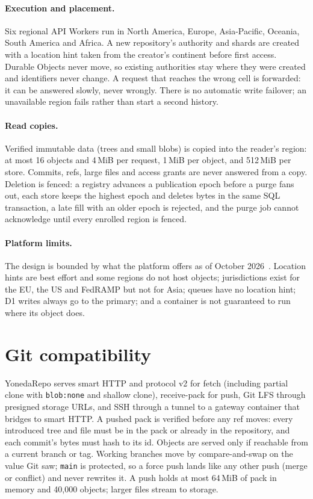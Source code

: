 \documentclass[11pt]{article}
\newcommand{\code}[1]{\texttt{#1}}
\begin{document}
\paragraph{Execution and placement.} Six regional API Workers run in North America,
Europe, Asia-Pacific, Oceania, South America and Africa. A new repository's authority
and shards are created with a location hint taken from the creator's continent before
first access. Durable Objects never move, so existing authorities stay where they were
created and identifiers never change. A request that reaches the wrong cell is
forwarded: it can be answered slowly, never wrongly. There is no automatic write
failover; an unavailable region fails rather than start a second history.

\paragraph{Read copies.} Verified immutable data (trees and small blobs) is copied into
the reader's region: at most 16 objects and 4\,MiB per request, 1\,MiB per object, and
512\,MiB per store. Commits, refs, large files and access grants are never answered from
a copy. Deletion is fenced: a registry advances a publication epoch before a purge fans
out, each store keeps the highest epoch and deletes bytes in the same SQL transaction, a
late fill with an older epoch is rejected, and the purge job cannot acknowledge until
every enrolled region is fenced.

\paragraph{Platform limits.} The design is bounded by what the platform offers as of
October 2026~\cite{cfdurableobjects}. Location hints are best effort and some regions do
not host objects; jurisdictions exist for the EU, the US and FedRAMP but not for Asia;
queues have no location hint; D1 writes always go to the primary; and a container is not
guaranteed to run where its object does.

\section{Git compatibility}
\label{sec:git}

YonedaRepo serves smart HTTP and protocol v2 for fetch (including partial clone with
\code{blob:none} and shallow clone), receive-pack for push, Git LFS through presigned
storage URLs, and SSH through a tunnel to a gateway container that bridges to smart HTTP.
A pushed pack is verified before any ref moves: every introduced tree and file must be
in the pack or already in the repository, and each commit's bytes must hash to its id.
Objects are served only if reachable from a current branch or tag. Working branches move
by compare-and-swap on the value Git saw; \code{main} is protected, so a force push lands
like any other push (merge or conflict) and never rewrites it. A push holds at most
64\,MiB of pack in memory and 40,000 objects; larger files stream to storage.
\end{document}
